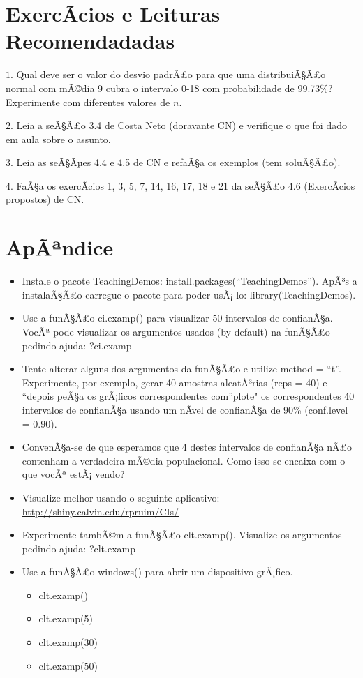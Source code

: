 \documentclass[]{article}
\providecommand{\tightlist}{%
  \setlength{\itemsep}{0pt}\setlength{\parskip}{0pt}}
\begin{document}
\section{ExercÃ­cios e Leituras
Recomendadadas}\label{exercacios-e-leituras-recomendadadas}

\(1\). Qual deve ser o valor do desvio padrÃ£o para que uma
distribuiÃ§Ã£o normal com mÃ©dia 9 cubra o intervalo 0-18 com
probabilidade de 99.73\%? Experimente com diferentes valores de \(n\).

\(2\). Leia a seÃ§Ã£o 3.4 de Costa Neto (doravante CN) e verifique o que
foi dado em aula sobre o assunto.

\(3\). Leia as seÃ§Ãµes 4.4 e 4.5 de CN e refaÃ§a os exemplos (tem
soluÃ§Ã£o).

\(4\). FaÃ§a os exercÃ­cios 1, 3, 5, 7, 14, 16, 17, 18 e 21 da seÃ§Ã£o
4.6 (ExercÃ­cios propostos) de CN.

\section{ApÃªndice}\label{apandice}

\begin{itemize}
\item
  Instale o pacote TeachingDemos: install.packages(``TeachingDemos'').
  ApÃ³s a instalaÃ§Ã£o carregue o pacote para poder usÃ¡-lo:
  library(TeachingDemos).
\item
  Use a funÃ§Ã£o ci.examp() para visualizar 50 intervalos de confianÃ§a.
  VocÃª pode visualizar os argumentos usados (by default) na funÃ§Ã£o
  pedindo ajuda: ?ci.examp
\item
  Tente alterar alguns dos argumentos da funÃ§Ã£o e utilize method =
  ``t''. Experimente, por exemplo, gerar 40 amostras aleatÃ³rias (reps =
  40) e ``depois peÃ§a os grÃ¡ficos correspondentes com''plote" os
  correspondentes 40 intervalos de confianÃ§a usando um nÃ­vel de
  confianÃ§a de 90\% (conf.level = 0.90).
\item
  ConvenÃ§a-se de que esperamos que 4 destes intervalos de confianÃ§a
  nÃ£o contenham a verdadeira mÃ©dia populacional. Como isso se encaixa
  com o que vocÃª estÃ¡ vendo?
\item
  Visualize melhor usando o seguinte aplicativo:
  \url{http://shiny.calvin.edu/rpruim/CIs/}
\item
  Experimente tambÃ©m a funÃ§Ã£o clt.examp(). Visualize os argumentos
  pedindo ajuda: ?clt.examp
\item
  Use a funÃ§Ã£o windows() para abrir um dispositivo grÃ¡fico.

  \begin{itemize}
  \tightlist
  \item
    clt.examp()
  \item
    clt.examp(5)
  \item
    clt.examp(30)
  \item
    clt.examp(50)
  \end{itemize}
\end{itemize}
\end{document}
